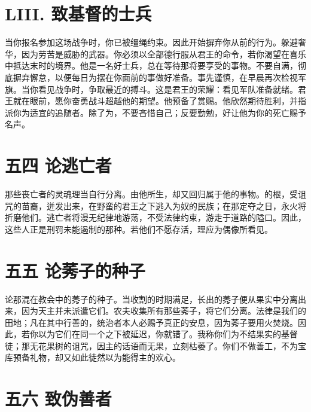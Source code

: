 \section{LIII. 致基督的士兵}

当你报名参加这场战争时，你已被缰绳约束。因此开始摒弃你从前的行为。躲避奢华，因为劳苦是威胁的武器。你必须以全部德行服从君王的命令，若你渴望在喜乐中抵达末时的境界。他是一名好士兵，总在等待那将要享受的事物。不要自满，彻底摒弃懈怠，以便每日为摆在你面前的事做好准备。事先谨慎，在早晨再次检视军旗。当你看见战争时，争取最近的搏斗。这是君王的荣耀：看见军队准备就绪。君王就在眼前，愿你奋勇战斗超越他的期望。他预备了赏赐。他欣然期待胜利，并指派你为适宜的追随者。除了为，不要吝惜自己；反要勤勉，好让他为你的死亡赐予名声。\par


\section{五四 论逃亡者}

那些丧亡者的灵魂理当自行分离。由他所生，却又回归属于他的事物。的根，受诅咒的苗裔，迸发出来，在野蛮的君王之下逃入为奴的民族；在那定夺之日，永火将折磨他们。逃亡者将漫无纪律地游荡，不受法律约束，游走于道路的隘口。因此，这些人正是刑罚未能遏制的那种。若他们不愿存活，理应为偶像所看见。\par


\section{五五 论莠子的种子}

论那混在教会中的莠子的种子。当收割的时期满足，长出的莠子便从果实中分离出来，因为天主并未派遣它们。农夫收集所有那些莠子，将它们分离。法律是我们的田地；凡在其中行善的，统治者本人必赐予真正的安息，因为莠子要用火焚烧。因此，若你以为它们在同一个之下被延迟，你就错了。我称你们为不结果实的基督徒；那无花果树的诅咒，因主的话语而无果，立刻枯萎了。你们不做善工，不为宝库预备礼物，却又如此徒然以为能得主的欢心。\par


\section{五六 致伪善者}

